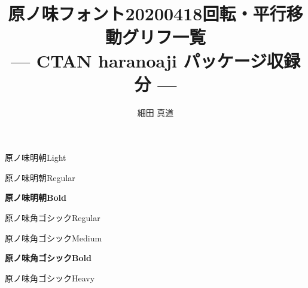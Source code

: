 \documentclass[dvipdfmx]{jsarticle}
\title{原ノ味フォント20200418回転・平行移動グリフ一覧 \\
--- CTAN haranoaji パッケージ収録分 ---}
\author{細田 真道}
\begin{document}
\maketitle

\clearpage
\parindent=0pt
\fboxsep=0pt

\mcfamily\ltseries
{\Large 原ノ味明朝\textmd{Light}}

\testAll

\clearpage

\mcfamily\mdseries
{\Large 原ノ味明朝\textmd{Regular}}

\testAll

\clearpage

\mcfamily\bfseries
{\Large 原ノ味明朝\textmd{Bold}}

\testAll

\clearpage

\gtfamily\mdseries
{\Large 原ノ味角ゴシック\textmd{Regular}}

\testAll

\clearpage

\mgfamily %
{\Large 原ノ味角ゴシック\textmd{Medium}}

\testAll

\clearpage

\gtfamily\bfseries
{\Large 原ノ味角ゴシック\textmd{Bold}}

\testAll

\clearpage

\gtfamily\ebseries
{\Large 原ノ味角ゴシック\textmd{Heavy}}

\testAll
\end{document}
